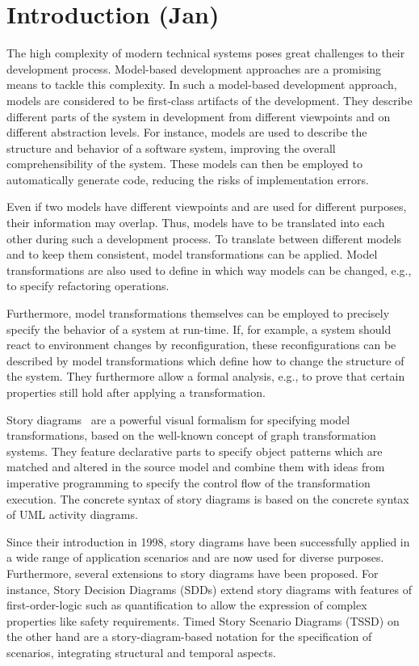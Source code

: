\chapter{Introduction (Jan)}
The high complexity of modern technical systems poses great challenges to their development process.
Model-based development approaches are a promising means to tackle this complexity.
In such a model-based development approach, models are considered to be first-class artifacts of the development.
They describe different parts of the system in development from different viewpoints and on different abstraction levels.
For instance, models are used to describe the structure and behavior of a software system, improving the overall comprehensibility of the system.
These models can then be employed to automatically generate code, reducing the risks of implementation errors.

Even if two models have different viewpoints and are used for different purposes, their information may overlap.
Thus, models have to be translated into each other during such a development process.
To translate between different models and to keep them consistent, model transformations can be applied.
Model transformations are also used to define in which way models can be changed, e.g., to specify refactoring operations.

Furthermore, model transformations themselves can be employed to precisely specify the behavior of a system at run-time.
If, for example, a system should react to environment changes by reconfiguration, these reconfigurations can be described by model transformations which define how to change the structure of the system.
They furthermore allow a formal analysis, e.g., to prove that certain properties still hold after applying a transformation.

Story diagrams~\cite{ZSW99,FNTZ00,Zun01} are a powerful visual formalism for specifying model transformations, based on the well-known concept of graph transformation systems.
They feature declarative parts to specify object patterns which are matched and altered in the source model and combine them with ideas from imperative programming to specify the control flow of the transformation execution.
The concrete syntax of story diagrams is based on the concrete syntax of UML activity diagrams.

Since their introduction in 1998, story diagrams have been successfully applied in a wide range of application scenarios and are now used for diverse purposes.
Furthermore, several extensions to story diagrams have been proposed.
For instance, Story Decision Diagrams (SDDs) \cite{GK06a} extend story diagrams with features of first-order-logic such as quantification to allow the expression of complex properties like safety requirements.
Timed Story Scenario Diagrams (TSSD) \cite{KG07a} on the other hand are a story-diagram-based notation for the specification of scenarios, integrating structural and temporal aspects.

